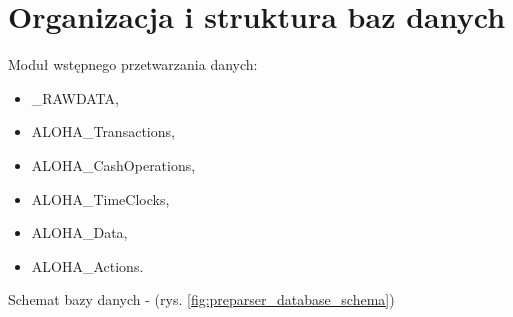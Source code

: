 \documentclass[a4paper]{book}
\begin{document}
\section{Organizacja i struktura baz danych}
Moduł wstępnego przetwarzania danych:
 \begin{itemize}
	\item \_RAWDATA,
	\item ALOHA\_Transactions,
	\item ALOHA\_CashOperations,
	\item ALOHA\_TimeClocks,
	\item ALOHA\_Data,
	\item ALOHA\_Actions.
\end{itemize}
Schemat bazy danych - (rys. \ref{fig:preparser_database_schema})
\begin{figure}[t]
	\centering

\end{figure}
\end{document}
